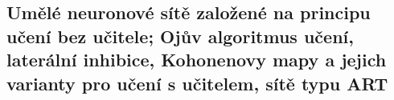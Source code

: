 \subsection{Umělé neuronové sítě založené na principu učení bez učitele; Ojův algoritmus učení, laterální inhibice, Kohonenovy mapy a jejich varianty pro učení s učitelem, sítě typu ART}